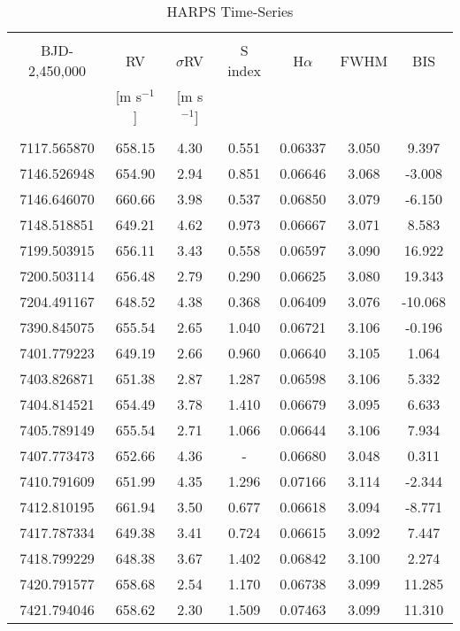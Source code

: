 \begin{table}
\tiny
\renewcommand{\arraystretch}{0.7}
\centering
\caption{HARPS Time-Series}
\label{table:data}
\begin{tabular}{ccccccc}
\hline \\ [-1ex]
BJD-2,450,000 & RV & $\sigma$RV & S index & H$\alpha$ & FWHM & BIS \\
& [m s$^{-1}$] & [m s$^{-1}$] &  &  & & \\
\hline \\ [-1ex]
7117.565870 & 658.15 & 4.30 & 0.551 & 0.06337 & 3.050 & 9.397 \\
7146.526948 & 654.90 & 2.94 & 0.851 & 0.06646 & 3.068 & -3.008 \\
7146.646070 & 660.66 & 3.98 & 0.537 & 0.06850 & 3.079 & -6.150 \\
7148.518851 & 649.21 & 4.62 & 0.973 & 0.06667 & 3.071 & 8.583 \\
7199.503915 & 656.11 & 3.43 & 0.558 & 0.06597 & 3.090 & 16.922 \\
7200.503114 & 656.48 & 2.79 & 0.290 & 0.06625 & 3.080 & 19.343 \\
7204.491167 & 648.52 & 4.38 & 0.368 & 0.06409 & 3.076 & -10.068 \\
7390.845075 & 655.54 & 2.65 & 1.040 & 0.06721 & 3.106 & -0.196 \\
7401.779223 & 649.19 & 2.66 & 0.960 & 0.06640 & 3.105 & 1.064 \\
7403.826871 & 651.38 & 2.87 & 1.287 & 0.06598 & 3.106 & 5.332 \\
7404.814521 & 654.49 & 3.78 & 1.410 & 0.06679 & 3.095 & 6.633 \\
7405.789149 & 655.54 & 2.71 & 1.066 & 0.06644 & 3.106 & 7.934 \\
7407.773473 & 652.66 & 4.36 & - & 0.06680 & 3.048 & 0.311 \\
7410.791609 & 651.99 & 4.35 & 1.296 & 0.07166 & 3.114 & -2.344 \\
7412.810195 & 661.94 & 3.50 & 0.677 & 0.06618 & 3.094 & -8.771 \\
7417.787334 & 649.38 & 3.41 & 0.724 & 0.06615 & 3.092 & 7.447 \\
7418.799229 & 648.38 & 3.67 & 1.402 & 0.06842 & 3.100 & 2.274 \\
7420.791577 & 658.68 & 2.54 & 1.170 & 0.06738 & 3.099 & 11.285 \\
7421.794046 & 658.62 & 2.30 & 1.509 & 0.07463 & 3.099 & 11.310 \\

\end{tabular}
\end{table}
